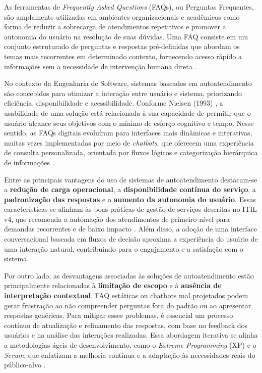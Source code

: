As ferramentas de \textit{Frequently Asked Questions} (FAQs), ou Perguntas Frequentes, são amplamente utilizadas em ambientes organizacionais e acadêmicos como forma de reduzir a sobrecarga de atendimentos repetitivos e promover a autonomia do usuário na resolução de suas dúvidas. Uma FAQ consiste em um conjunto estruturado de perguntas e respostas pré-definidas que abordam os temas mais recorrentes em determinado contexto, fornecendo acesso rápido a informações sem a necessidade de intervenção humana direta \cite{pressman2016engenharia}.

No contexto da Engenharia de Software, sistemas baseados em autoatendimento são concebidos para otimizar a interação entre usuário e sistema, priorizando eficiência, disponibilidade e acessibilidade. Conforme Nielsen (1993) \cite{nielsen1993usability}, a usabilidade de uma solução está relacionada à sua capacidade de permitir que o usuário alcance seus objetivos com o mínimo de esforço cognitivo e tempo. Nesse sentido, as FAQs digitais evoluíram para interfaces mais dinâmicas e interativas, muitas vezes implementadas por meio de \textit{chatbots}, que oferecem uma experiência de consulta personalizada, orientada por fluxos lógicos e categorização hierárquica de informações \cite{preece2015interaction}.

Entre as principais vantagens do uso de sistemas de autoatendimento destacam-se a \textbf{redução de carga operacional}, a \textbf{disponibilidade contínua do serviço}, a \textbf{padronização das respostas} e o \textbf{aumento da autonomia do usuário}. Essas características se alinham às boas práticas de gestão de serviços descritas no ITIL v4, que recomenda a automação dos atendimentos de primeiro nível para demandas recorrentes e de baixo impacto \cite{axelos2019itil}. Além disso, a adoção de uma interface conversacional baseada em fluxos de decisão aproxima a experiência do usuário de uma interação natural, contribuindo para o engajamento e a satisfação com o sistema.

Por outro lado, as desvantagens associadas às soluções de autoatendimento estão principalmente relacionadas à \textbf{limitação de escopo} e à \textbf{ausência de interpretação contextual}. FAQ estáticas ou chatbots mal projetados podem gerar frustração ao não compreender perguntas fora do padrão ou ao apresentar respostas genéricas. Para mitigar esses problemas, é essencial um processo contínuo de atualização e refinamento das respostas, com base no feedback dos usuários e na análise das interações realizadas. Essa abordagem iterativa se alinha a metodologias ágeis de desenvolvimento, como o \textit{Extreme Programming} (XP) e o \textit{Scrum}, que enfatizam a melhoria contínua e a adaptação às necessidades reais do público-alvo \cite{beck1999extreme}.

